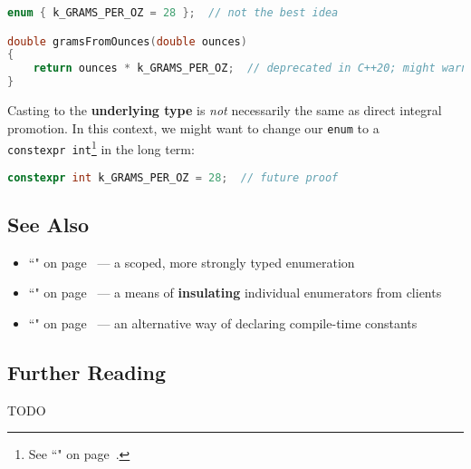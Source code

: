 \begin{lstlisting}[language=C++]
enum { k_GRAMS_PER_OZ = 28 };  // not the best idea

double gramsFromOunces(double ounces)
{
    return ounces * k_GRAMS_PER_OZ;  // deprecated in C++20; might warn
}
\end{lstlisting}
    
\noindent Casting to the \textbf{underlying type} is \emph{not} necessarily the
same as direct integral promotion. In this context, we might want to
change our \texttt{enum} to a
\texttt{constexpr}~\texttt{int}{\cprotect\footnote{See
  ``" on page~\pageref{constexprvar}.}} in the long
term:

\begin{lstlisting}[language=C++]
constexpr int k_GRAMS_PER_OZ = 28;  // future proof
\end{lstlisting}
    

\subsection[See Also]{See Also}\label{see-also}

\begin{itemize}
\item{``" on page~\pageref{enumclass} — a scoped, more strongly typed enumeration}
\item{``" on page~\pageref{enumopaque} — a means of \textbf{insulating} individual enumerators from clients}
\item{``" on page~\pageref{constexprvar} — an alternative way of declaring compile-time constants}
\end{itemize}

\subsection[Further Reading]{Further Reading}\label{further-reading}

TODO


